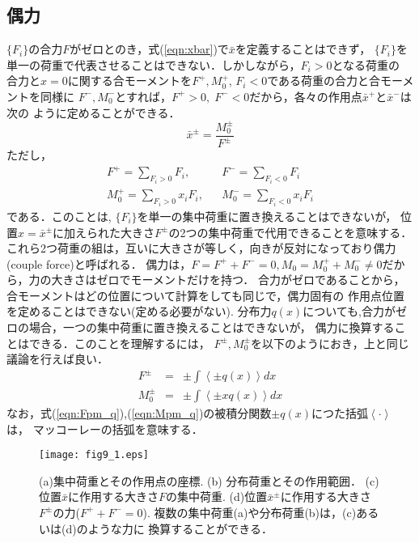 \documentclass[10pt,a4j]{jarticle}
\begin{document}
\subsection{偶力}
$\{F_i\}$の合力$F$がゼロとのき，式(\ref{eqn:xbar})で$\bar x$を定義することはできず，
$\{F_i\}$を単一の荷重で代表させることはできない．しかしながら，$F_i >0$となる荷重の
合力と$x=0$に関する合モーメントを$F^+, M_0^+$, $F_i<0$である荷重の合力と合モーメントを同様に
$F^-, M_0^-$とすれば，$F^+>0,\; F^-<0$だから，各々の作用点$\bar x^+$と$\bar x^-$は次の
ように定めることができる．
\begin{equation}
	\bar x ^\pm = \frac{M_0^\pm }{F ^\pm} 
	\label{eqn:xbar_pm}
\end{equation}
ただし，
\begin{eqnarray}
	F^+ = \sum _{ F_i > 0 } F_i, & & F^- = \sum _{F_i < 0 } F_i 
	\label{eqn:F_pm}
	\\
	M_0^+ = \sum _{F_i > 0 } x_i F_i, & & M_0^- = \sum _{F_i < 0 } x_iF_i 
	\label{eqn:M_pm}
\end{eqnarray}
である．このことは, $\{F_i\}$を単一の集中荷重に置き換えることはできないが，
位置$x=\bar x ^\pm$に加えられた大きさ$F^\pm$の2つの集中荷重で代用できることを意味する．
これら2つ荷重の組は，互いに大きさが等しく，向きが反対になっており偶力(couple force)と呼ばれる．
偶力は，$F=F^++F^-=0, M_0=M_0^+ + M_0^-\neq 0$だから，力の大きさはゼロでモーメントだけを持つ．
合力がゼロであることから，合モーメントはどの位置について計算をしても同じで，偶力固有の
作用点位置を定めることはできない(定める必要がない). 
分布力$q(x)$についても,合力がゼロの場合，一つの集中荷重に置き換えることはできないが，
偶力に換算することはできる．このことを理解するには，
$F^\pm, M_0^\pm$を以下のようにおき，上と同じ議論を行えば良い．
\begin{eqnarray}
	F^\pm &=& \pm \int \left< \pm q(x) \right>dx
	\label{eqn:Fpm_q} \\
	M_0^\pm &=& \pm \int \left< \pm xq(x) \right>dx
	\label{eqn:Mpm_q}
\end{eqnarray}
なお，式(\ref{eqn:Fpm_q}),(\ref{eqn:Mpm_q})の被積分関数$\pm q(x)$につた括弧$\left< \cdot \right>$は，
マッコーレーの括弧を意味する．
\begin{figure}[h]
	\begin{center}
	\texttt{[image: fig9\_1.eps]} 
	\end{center}
	\caption{
		(a)集中荷重とその作用点の座標. (b) 分布荷重とその作用範囲．
		(c)位置$\bar x$に作用する大きさ$F$の集中荷重. 
		(d)位置$\bar x^\pm$に作用する大きさ$F^\pm$の力($F^++F^-=0$). 
		複数の集中荷重(a)や分布荷重(b)は，(c)あるいは(d)のような力に
		換算することができる．
	} 
	\label{fig:fig9_1}
\end{figure}
\end{document}
